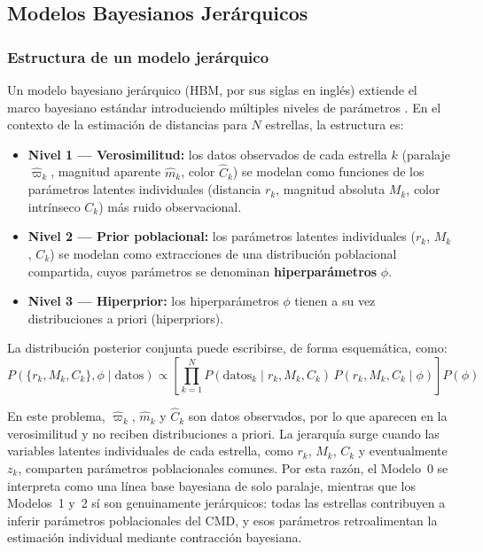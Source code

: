 \documentclass[stu, 12pt, letterpaper, donotrepeattitle, floatsintext, natbib]{apa7_ula}
\begin{document}
\subsection{Modelos Bayesianos Jerárquicos}

\subsubsection{Estructura de un modelo jerárquico}
Un modelo bayesiano jerárquico (HBM, por sus siglas en inglés)
extiende el marco bayesiano estándar introduciendo múltiples niveles
de parámetros \citep[cap.~5]{Gelman_BDA3}. En el contexto de la estimación de distancias para
$N$ estrellas, la estructura es:

\begin{itemize}
    \item \textbf{Nivel 1 --- Verosimilitud:} los datos observados
    de cada estrella $k$ (paralaje $\hat{\varpi}_k$, magnitud
    aparente $\hat{m}_k$, color $\hat{C}_k$) se modelan como
    funciones de los parámetros latentes individuales (distancia
    $r_k$, magnitud absoluta $M_k$, color intrínseco $C_k$) más
    ruido observacional.
    \item \textbf{Nivel 2 --- Prior poblacional:} los parámetros
    latentes individuales ($r_k$, $M_k$, $C_k$) se modelan como
    extracciones de una distribución poblacional compartida, cuyos
    parámetros se denominan \textbf{hiperparámetros} $\phi$.
    \item \textbf{Nivel 3 --- Hiperprior:} los hiperparámetros
    $\phi$ tienen a su vez distribuciones a priori (hiperpriors).
\end{itemize}

La distribución posterior conjunta puede escribirse, de forma
esquemática, como:
\begin{equation}
    P(\{r_k, M_k, C_k\}, \phi \mid \text{datos}) \propto
    \left[\prod_{k=1}^{N} P(\text{datos}_k \mid r_k, M_k, C_k) \,
    P(r_k, M_k, C_k \mid \phi)\right] P(\phi)
    \label{eq:hbm}
\end{equation}

En este problema, $\hat{\varpi}_k$, $\hat{m}_k$ y $\hat{C}_k$ son
datos observados, por lo que aparecen en la verosimilitud y no reciben
distribuciones a priori. La jerarquía surge cuando las variables
latentes individuales de cada estrella, como $r_k$, $M_k$, $C_k$ y
eventualmente $z_k$, comparten parámetros poblacionales comunes. Por
esta razón, el Modelo~0 se interpreta como una línea base bayesiana de
solo paralaje, mientras que los Modelos~1 y~2 sí son genuinamente
jerárquicos: todas las estrellas contribuyen a inferir parámetros
poblacionales del CMD, y esos parámetros retroalimentan la estimación
individual mediante contracción bayesiana.
\end{document}

